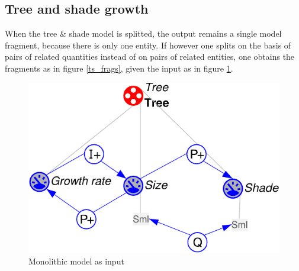 \documentclass{article} %
\begin{document}


\subsection{Tree and shade growth} 

When the tree \& shade model is splitted, the output remains a single model
fragment, because there is only one entity. If however one splits on the basis
of pairs of related quantities instead of on pairs of related entities, one
obtains the fragments as in figure \ref{ts_frags}, given the input as in figure
\ref{ts_mono}.


\begin{figure}[ht]
\centering
\includegraphics[scale=0.5]{ts_mono-crop.pdf}
\caption{Monolithic model as input}
\label{ts_mono}
\end{figure}

\end{document}
